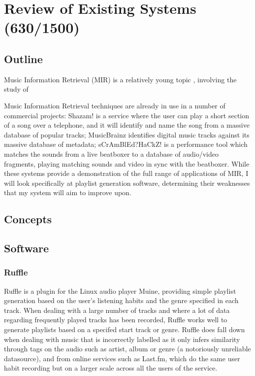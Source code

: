 \chapter{Review of Existing Systems (630/1500)}
\section{Outline}
Music Information Retrieval (MIR) is a relatively young topic \citep{Fingerhut2004}, involving the study of 


Music Information Retrieval techniques are already in use in a number of commercial projects: Shazam! is a service where the user can play a short section of a song over a telephone, and it will identify and name the song from a massive database of popular tracks; MusicBrainz identifies digital music tracks against its massive database of metadata; sCrAmBlEd?HaCkZ! is a performance tool which matches the sounds from a live beatboxer to a database of audio/video fragments, playing matching sounds and video in sync with the beatboxer. While these systems provide a demonstration of the full range of applications of MIR, I will look specifically at playlist generation software, determining their weaknesses that my system will aim to improve upon.
\section{Concepts}
\section{Software}
\subsection{Ruffle}
Ruffle is a plugin for the Linux audio player Muine, providing simple playlist generation based on the user's listening habits and the genre specified in each track. When dealing with a large number of tracks and where a lot of data regarding frequently played tracks has been recorded, Ruffle works well to generate playlists based on a specifed start track or genre. Ruffle does fall down when dealing with music that is incorrectly labelled as it only infers similarity through tags on the audio such as artist, album or genre (a notoriously unreliable datasource), and from online services such as Last.fm, which do the same user habit recording but on a larger scale across all the users of the service.
